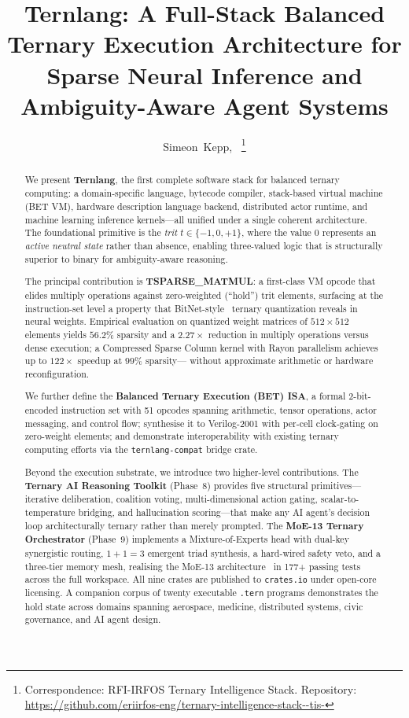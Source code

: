 \documentclass[journal,10pt,twocolumn]{IEEEtran}
\title{Ternlang: A Full-Stack Balanced Ternary Execution Architecture
       for Sparse Neural Inference and Ambiguity-Aware Agent Systems}
\author{Simeon~Kepp,~\IEEEmembership{RFI-IRFOS}%
\thanks{Correspondence: RFI-IRFOS Ternary Intelligence Stack.
Repository: \url{https://github.com/eriirfos-eng/ternary-intelligence-stack--tis-}}%
}
\begin{document}
\maketitle

\begin{abstract}
We present \textbf{Ternlang}, the first complete software stack for
balanced ternary computing: a domain-specific language, bytecode compiler,
stack-based virtual machine (BET VM), hardware description language backend,
distributed actor runtime, and machine learning inference kernels—all unified
under a single coherent architecture. The foundational primitive is the
\emph{trit} $t \in \{-1, 0, +1\}$, where the value $0$ represents an
\emph{active neutral state} rather than absence, enabling three-valued logic
that is structurally superior to binary for ambiguity-aware reasoning.

The principal contribution is \textbf{TSPARSE\_MATMUL}: a first-class VM
opcode that elides multiply operations against zero-weighted (``hold'') trit
elements, surfacing at the instruction-set level a property that
BitNet-style~\cite{ma2024era} ternary quantization reveals in neural weights.
Empirical evaluation on quantized weight matrices of $512 \times 512$
elements yields $56.2\%$ sparsity and a $2.27\times$ reduction in multiply
operations versus dense execution; a Compressed Sparse Column kernel with
Rayon parallelism achieves up to $122\times$ speedup at $99\%$ sparsity—
without approximate arithmetic or hardware reconfiguration.

We further define the \textbf{Balanced Ternary Execution (BET) ISA}, a
formal 2-bit-encoded instruction set with 51 opcodes spanning arithmetic,
tensor operations, actor messaging, and control flow; synthesise it to
Verilog-2001 with per-cell clock-gating on zero-weight elements; and
demonstrate interoperability with existing ternary computing efforts via the
\texttt{ternlang-compat} bridge crate.

Beyond the execution substrate, we introduce two higher-level contributions.
The \textbf{Ternary AI Reasoning Toolkit} (Phase~8) provides five structural
primitives—iterative deliberation, coalition voting, multi-dimensional action
gating, scalar-to-temperature bridging, and hallucination scoring—that make
any AI agent's decision loop architecturally ternary rather than merely
prompted. The \textbf{MoE-13 Ternary Orchestrator} (Phase~9) implements a
Mixture-of-Experts head with dual-key synergistic routing, $1{+}1{=}3$
emergent triad synthesis, a hard-wired safety veto, and a three-tier memory
mesh, realising the MoE-13 architecture~\cite{moe13_2026} in 177+ passing
tests across the full workspace. All nine crates are published to
\texttt{crates.io} under open-core licensing. A companion corpus of
twenty executable \texttt{.tern} programs demonstrates the hold state
across domains spanning aerospace, medicine, distributed systems, civic
governance, and AI agent design.
\end{abstract}
\end{document}

